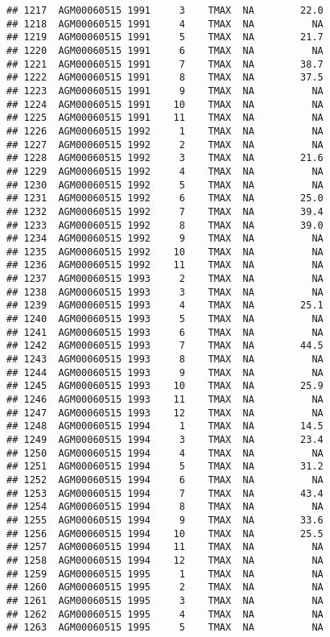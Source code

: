 \documentclass{article}\usepackage[]{graphicx}\usepackage[]{color}
\makeatletter
\newenvironment{kframe}{%
 \def\at@end@of@kframe{}%
 \ifinner\ifhmode%
  \def\at@end@of@kframe{\end{minipage}}%
  \begin{minipage}{\columnwidth}%
 \fi\fi%
 \def\FrameCommand##1{\hskip\@totalleftmargin \hskip-\fboxsep
 \colorbox{shadecolor}{##1}\hskip-\fboxsep
     \hskip-\linewidth \hskip-\@totalleftmargin \hskip\columnwidth}%
 \MakeFramed {\advance\hsize-\width
   \@totalleftmargin\z@ \linewidth\hsize
   \@setminipage}}%
 {\par\unskip\endMakeFramed%
 \at@end@of@kframe}
\newenvironment{knitrout}{}{} %
\makeatother
\begin{document}
\begin{knitrout}
\begin{kframe}
\begin{verbatim}
## 1217  AGM00060515 1991     3    TMAX  NA        22.0
## 1218  AGM00060515 1991     4    TMAX  NA          NA
## 1219  AGM00060515 1991     5    TMAX  NA        21.7
## 1220  AGM00060515 1991     6    TMAX  NA          NA
## 1221  AGM00060515 1991     7    TMAX  NA        38.7
## 1222  AGM00060515 1991     8    TMAX  NA        37.5
## 1223  AGM00060515 1991     9    TMAX  NA          NA
## 1224  AGM00060515 1991    10    TMAX  NA          NA
## 1225  AGM00060515 1991    11    TMAX  NA          NA
## 1226  AGM00060515 1992     1    TMAX  NA          NA
## 1227  AGM00060515 1992     2    TMAX  NA          NA
## 1228  AGM00060515 1992     3    TMAX  NA        21.6
## 1229  AGM00060515 1992     4    TMAX  NA          NA
## 1230  AGM00060515 1992     5    TMAX  NA          NA
## 1231  AGM00060515 1992     6    TMAX  NA        25.0
## 1232  AGM00060515 1992     7    TMAX  NA        39.4
## 1233  AGM00060515 1992     8    TMAX  NA        39.0
## 1234  AGM00060515 1992     9    TMAX  NA          NA
## 1235  AGM00060515 1992    10    TMAX  NA          NA
## 1236  AGM00060515 1992    11    TMAX  NA          NA
## 1237  AGM00060515 1993     2    TMAX  NA          NA
## 1238  AGM00060515 1993     3    TMAX  NA          NA
## 1239  AGM00060515 1993     4    TMAX  NA        25.1
## 1240  AGM00060515 1993     5    TMAX  NA          NA
## 1241  AGM00060515 1993     6    TMAX  NA          NA
## 1242  AGM00060515 1993     7    TMAX  NA        44.5
## 1243  AGM00060515 1993     8    TMAX  NA          NA
## 1244  AGM00060515 1993     9    TMAX  NA          NA
## 1245  AGM00060515 1993    10    TMAX  NA        25.9
## 1246  AGM00060515 1993    11    TMAX  NA          NA
## 1247  AGM00060515 1993    12    TMAX  NA          NA
## 1248  AGM00060515 1994     1    TMAX  NA        14.5
## 1249  AGM00060515 1994     3    TMAX  NA        23.4
## 1250  AGM00060515 1994     4    TMAX  NA          NA
## 1251  AGM00060515 1994     5    TMAX  NA        31.2
## 1252  AGM00060515 1994     6    TMAX  NA          NA
## 1253  AGM00060515 1994     7    TMAX  NA        43.4
## 1254  AGM00060515 1994     8    TMAX  NA          NA
## 1255  AGM00060515 1994     9    TMAX  NA        33.6
## 1256  AGM00060515 1994    10    TMAX  NA        25.5
## 1257  AGM00060515 1994    11    TMAX  NA          NA
## 1258  AGM00060515 1994    12    TMAX  NA          NA
## 1259  AGM00060515 1995     1    TMAX  NA          NA
## 1260  AGM00060515 1995     2    TMAX  NA          NA
## 1261  AGM00060515 1995     3    TMAX  NA          NA
## 1262  AGM00060515 1995     4    TMAX  NA          NA
## 1263  AGM00060515 1995     5    TMAX  NA          NA

\end{verbatim}
\end{kframe}
\end{knitrout}
\end{document}
